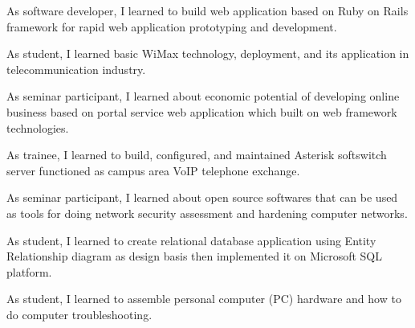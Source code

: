 \documentclass[10pt, a4paper]{moderncv}
\begin{document}
{
    \begin{scriptsize}
        As software developer, I learned to build web application based on Ruby on Rails framework for rapid web application prototyping and development.
    \end{scriptsize}
}
{
    \begin{scriptsize}
        As student, I learned basic WiMax technology, deployment, and its application in telecommunication industry.
    \end{scriptsize}
}
{
    \begin{scriptsize}
        As seminar participant, I learned about economic potential of developing online business based on portal service web application which built
        on web framework technologies.
    \end{scriptsize}
}
{
    \begin{scriptsize}
        As trainee, I learned to build, configured, and maintained Asterisk softswitch server functioned as campus area VoIP telephone exchange.
    \end{scriptsize}
}
{
    \begin{scriptsize}
        As seminar participant, I learned about open source softwares that can be used as tools for doing network security assessment and hardening
        computer networks.
    \end{scriptsize}
}
{
    \begin{scriptsize}
        As student, I learned to create relational database application using Entity Relationship diagram as design basis then implemented it
        on Microsoft SQL platform.
    \end{scriptsize}
}
{
    \begin{scriptsize}
        As student, I learned to assemble personal computer (PC) hardware and how to do computer troubleshooting.
    \end{scriptsize}
}
\end{document}
